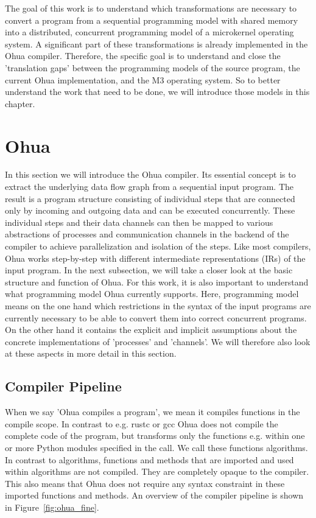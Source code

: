 The goal of this work is to understand which transformations are necessary to convert a program from a sequential programming model with shared memory into a distributed, concurrent programming model of a microkernel operating system. A significant part of these transformations is already implemented in the Ohua compiler. Therefore, the specific goal is to understand and close the 'translation gaps' between the programming models of the source program, the current Ohua implementation, and the M3 operating system. So to better understand the work that need to be done, we will introduce those models in this chapter.

\section{Ohua}
\label{sec:back_ohua}
In this section we will introduce the Ohua compiler\cite{ertel2015ohua}. Its essential concept is to extract the underlying data flow graph from a sequential input program. The result is a program structure consisting of individual steps that are connected only by incoming and outgoing data and can be executed concurrently. These individual steps and their data channels can then be mapped to various abstractions of processes and communication channels in the backend of the compiler to achieve parallelization and isolation of the steps. Like most compilers, Ohua works step-by-step with different intermediate representations (IRs) of the input program. In the next subsection, we will take a closer look at the basic structure and function of Ohua. For this work, it is also important to understand what programming model Ohua currently supports. Here, programming model means on the one hand which restrictions in the syntax of the input programs are currently necessary to be able to convert them into correct concurrent programs. On the other hand it contains the explicit and implicit assumptions about the concrete implementations of 'processes' and 'channels'. We will therefore also look at these aspects in more detail in this section.

\subsection{Compiler Pipeline}
When we say 'Ohua compiles a program', we mean it compiles functions in the compile scope. In contrast to e.g. rustc or gcc Ohua does not compile the complete code of the program, but transforms only the functions e.g. within one or more Python modules specified in the call. We call these functions algorithms. In contrast to algorithms, functions and methods that are imported and used within algorithms are not compiled. They are completely opaque to the compiler. This also means that Ohua does not require any syntax constraint in these imported functions and methods. An overview of the compiler pipeline is shown in Figure~\ref{fig:ohua_fine}.  

